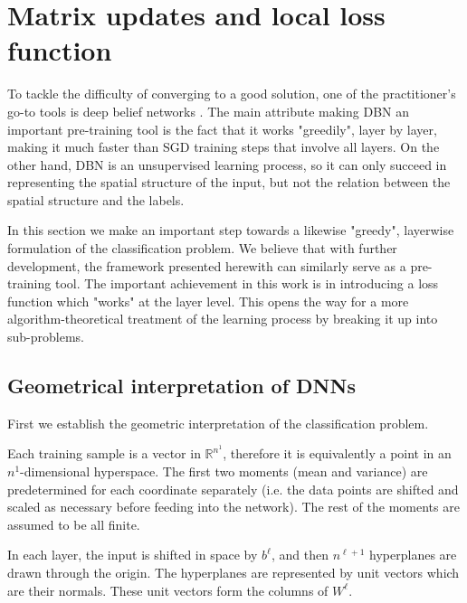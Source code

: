 \documentclass[]{article}
\begin{document}
	\section{Matrix updates and local loss function}
	  	
	  	To tackle the difficulty of converging to a good solution, one of the practitioner's  go-to tools is deep belief networks \cite{HintonDBN}. The main attribute making DBN an important pre-training tool is the fact that it works "greedily", layer by layer, making it much faster than SGD training steps that involve all layers. On the other hand, DBN is an unsupervised learning process, so it can only succeed in representing the spatial structure of the input, but not the relation between the spatial structure and the labels. 
	  	
	  	In this section we make an important step towards a likewise "greedy", layerwise formulation of the classification problem. We believe that with further development, the framework presented herewith can similarly serve as a pre-training tool. The important achievement in this work is in introducing a loss function which "works" at the layer level. This opens the way for a more algorithm-theoretical treatment of the learning process by breaking it up into sub-problems.
	  	

	 \subsection{Geometrical interpretation of DNNs}
	 	First we establish the geometric interpretation of the classification problem.
	 	
	 	Each training sample is a vector in $\mathbb{R}^{n^1}$, therefore it is equivalently a point in an $n^1$-dimensional hyperspace. The first two moments (mean and variance) are predetermined for each coordinate separately (i.e. the data points are shifted and scaled as necessary before feeding into the network). The rest of the moments are assumed to be all finite.
	 	
	 	In each layer, the input is shifted in space by $b^\ell$, and then $n^{\ell+1}$ hyperplanes are drawn through the origin. The hyperplanes are represented by unit vectors which are their normals. These unit vectors form the columns of $W^\ell$.
	 	
\end{document}
